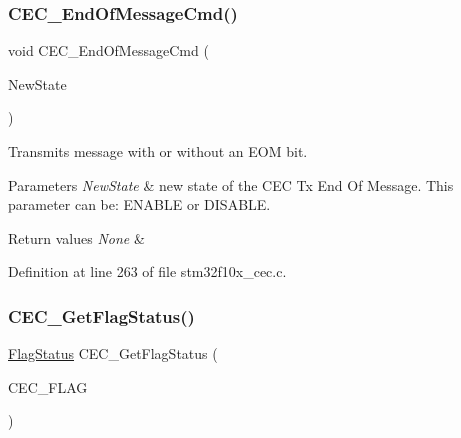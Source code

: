 \subsubsection{\texorpdfstring{C\+E\+C\+\_\+\+End\+Of\+Message\+Cmd()}{CEC\_EndOfMessageCmd()}}
{\footnotesize\ttfamily void C\+E\+C\+\_\+\+End\+Of\+Message\+Cmd (\begin{DoxyParamCaption}\item[{\hyperlink{group___exported__types_gac9a7e9a35d2513ec15c3b537aaa4fba1}{Functional\+State}}]{New\+State }\end{DoxyParamCaption})}



Transmits message with or without an E\+OM bit. 


\begin{DoxyParams}{Parameters}
{\em New\+State} & new state of the C\+EC Tx End Of Message. This parameter can be\+: E\+N\+A\+B\+LE or D\+I\+S\+A\+B\+LE. \\
\hline
\end{DoxyParams}

\begin{DoxyRetVals}{Return values}
{\em None} & \\
\hline
\end{DoxyRetVals}


Definition at line 263 of file stm32f10x\+\_\+cec.\+c.

\mbox{\label{group___c_e_c___private___functions_gaf920706cb350182bf0728c66868053ca}} 
\subsubsection{\texorpdfstring{C\+E\+C\+\_\+\+Get\+Flag\+Status()}{CEC\_GetFlagStatus()}}
{\footnotesize\ttfamily \hyperlink{group___exported__types_ga89136caac2e14c55151f527ac02daaff}{Flag\+Status} C\+E\+C\+\_\+\+Get\+Flag\+Status (\begin{DoxyParamCaption}\item[{uint32\+\_\+t}]{C\+E\+C\+\_\+\+F\+L\+AG }\end{DoxyParamCaption})}



